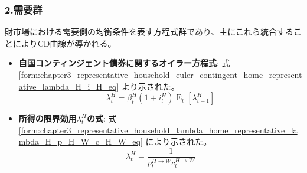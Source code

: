 \subsubsection*{2.需要群}
\label{sec:chapter5_two_plane_classification_demand}
財市場における需要側の均衡条件を表す方程式群であり、主にこれら統合することによりCD曲線が導かれる。
\begin{itemize}
    \item
    \label{itm:chapter5_two_plane_classification_demand_lambda_H_i_H}
        \textbf{自国コンティンジェント債券に関するオイラー方程式}:
        式
        \eqref{form:chapter3_representative_household_euler_contingent_home_representative_lambda_H_i_H_eq}
        より示された。
        \begin{equation}
        \label{form:chapter5_two_plane_classification_demand_lambda_H_i_H_eq}
            \lambda_t^H=\beta_t^H(1+i_t^H)\operatorname{E}_t[\lambda_{t+1}^H]
        \end{equation}   
    \item
    \label{itm:chapter5_two_plane_classification_demand_lambda_H_p_H_W_c_H_W}
        \textbf{所得の限界効用\(\lambda_t^H\)の式}:
        式
        \eqref{form:chapter3_representative_household_lambda_home_representative_lambda_H_p_H_W_c_H_W_eq}
        により示された。
        \begin{equation}
        \label{form:chapter5_two_plane_classification_demand_lambda_H_p_H_W_c_H_W_eq}
            \lambda_t^H=\frac{1}{p_t^{H\to W}c_t^{H\to W}}
        \end{equation}
\end{itemize}


